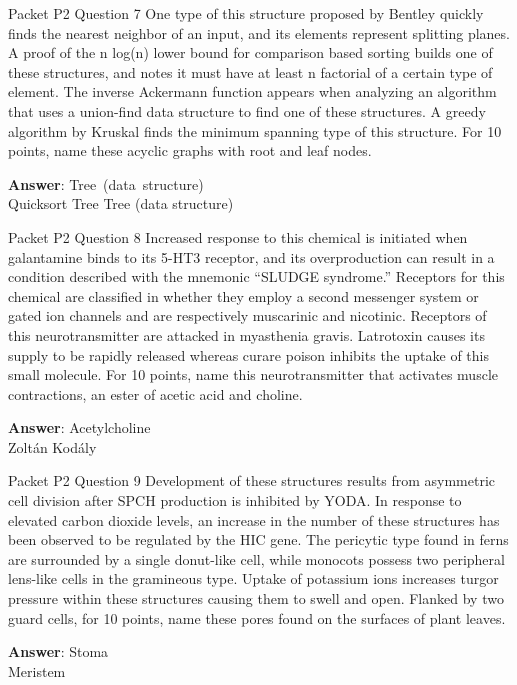 \begin{frame}{Packet P2 Question 7}
One type of this structure proposed by Bentley quickly finds the nearest neighbor of an input, and its elements represent splitting planes. A proof of the n log(n)     lower bound for comparison based sorting builds one of these structures, and notes it must have at least n factorial of a certain type of element. The inverse Ackermann function appears when analyzing an algorithm that uses a union-find data structure to find one of these structures. A greedy algorithm by Kruskal finds the minimum spanning type of this structure. For 10 points, name these acyclic   graphs with root and leaf nodes.  

\textbf{Answer}: Tree\ (data\ structure)\\
 Quicksort
 Tree
 Tree (data structure)
\end{frame}

\begin{frame}{Packet P2 Question 8}
Increased response to this chemical is initiated when galantamine   binds to its 5-HT3 receptor, and its overproduction can result in a condition described with the mnemonic ``SLUDGE syndrome.'' Receptors for this chemical are   classified in whether they employ a second messenger system or gated ion channels and are respectively muscarinic and nicotinic.   Receptors   of this neurotransmitter   are attacked in myasthenia gravis. Latrotoxin causes its supply to be rapidly released whereas curare poison inhibits the uptake of this small molecule. For 10 points, name this neurotransmitter that activates muscle contractions, an ester of acetic acid and choline.

\textbf{Answer}: Acetylcholine\\
 Zoltán Kodály
\end{frame}

\begin{frame}{Packet P2 Question 9}
Development of these structures results from asymmetric cell division after SPCH production is inhibited by YODA. In response to elevated carbon   dioxide levels, an increase in the number of these structures   has been observed   to be regulated by the HIC gene. The pericytic type found in ferns are surrounded by a single donut-like cell, while monocots possess two   peripheral lens-like cells in the gramineous type. Uptake of potassium ions increases turgor pressure   within these structures causing them to swell and open. Flanked by two guard cells, for 10 points, name these pores found on the surfaces of plant leaves.

\textbf{Answer}: Stoma\\
 Meristem
\end{frame}

